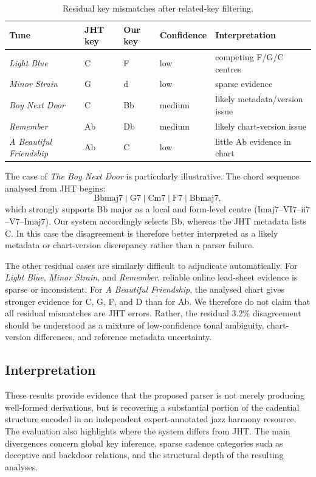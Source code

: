 \begin{table}[t]
\centering
\begin{tabular}{lllll}
\hline
Tune & JHT key & Our key & Confidence & Interpretation \\
\hline
\emph{Light Blue} & C & F & low & competing F/G/C centres \\
\emph{Minor Strain} & G & d & low & sparse evidence \\
\emph{Boy Next Door} & C & Bb & medium & likely metadata/version issue \\
\emph{Remember} & Ab & Db & medium & likely chart-version issue \\
\emph{A Beautiful Friendship} & Ab & C & low & little Ab evidence in chart \\
\hline
\end{tabular}
\caption{Residual key mismatches after related-key filtering.}
\label{tab:jht-residual-mismatches}
\end{table}

The case of \emph{The Boy Next Door} is particularly illustrative. The chord
sequence analysed from JHT begins:
\[
\mathrm{Bbmaj7}\;|\;\mathrm{G7}\;|\;\mathrm{Cm7}\;|\;\mathrm{F7}\;|\;\mathrm{Bbmaj7},
\]
which strongly supports Bb major as a local and form-level centre
(\(\mathrm{Imaj7}\)--\(\mathrm{VI7}\)--\(\mathrm{ii7}\)--\(\mathrm{V7}\)--\(\mathrm{Imaj7}\)).
Our system accordingly selects Bb, whereas the JHT metadata lists C. In this
case the disagreement is therefore better interpreted as a likely metadata or
chart-version discrepancy rather than a parser failure.

The other residual cases are similarly difficult to adjudicate automatically.
For \emph{Light Blue}, \emph{Minor Strain}, and \emph{Remember}, reliable
online lead-sheet evidence is sparse or inconsistent. For \emph{A Beautiful
Friendship}, the analysed chart gives stronger evidence for C, G, F, and D
than for Ab. We therefore do not claim that all residual mismatches are JHT
errors. Rather, the residual 3.2\% disagreement should be understood as a
mixture of low-confidence tonal ambiguity, chart-version differences, and
reference metadata uncertainty.

\subsection{Interpretation}

These results provide evidence that the proposed parser is not merely producing
well-formed derivations, but is recovering a substantial portion of the
cadential structure encoded in an independent expert-annotated jazz harmony
resource. The evaluation also highlights where the system differs from JHT.
The main divergences concern global key inference, sparse cadence categories
such as deceptive and backdoor relations, and the structural depth of the
resulting analyses.

